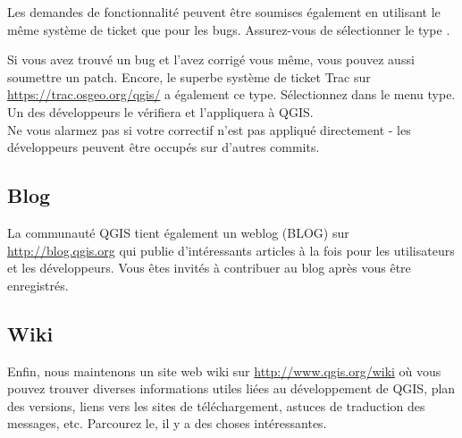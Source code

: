 Les demandes de fonctionnalité peuvent être soumises également en utilisant le
même système de ticket que pour les bugs. Assurez-vous de sélectionner le type
.

Si vous avez trouvé un bug et l'avez corrigé vous même, vous pouvez
aussi soumettre un patch. Encore, le superbe système de ticket Trac sur
\url{https://trac.osgeo.org/qgis/} a également ce type. Sélectionnez
 dans le menu type. Un des développeurs le vérifiera et
l'appliquera à QGIS.\\
Ne vous alarmez pas si votre correctif n'est pas appliqué directement - les
développeurs peuvent être occupés sur d'autres commits.


\subsection{Blog}
La communauté QGIS tient également un weblog (BLOG) sur
\url{http://blog.qgis.org} qui publie d'intéressants articles à la fois pour les
utilisateurs et les développeurs. Vous êtes invités à contribuer au blog après
vous être enregistrés.

\subsection{Wiki}
Enfin, nous maintenons un site web wiki sur \url{http://www.qgis.org/wiki} où vous
pouvez trouver diverses informations utiles liées au développement de QGIS, plan
des versions, liens vers les sites de téléchargement, astuces de
traduction des messages, etc. Parcourez le, il y a des choses intéressantes.
